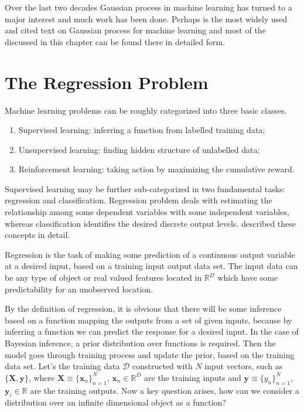 Over the last two decades Gaussian process in machine learning has turned to a major interest and much work has been done. Perhaps \cite{Rasmussen_and_Williams:2006} is the most widely used and cited text on Gaussian process for machine learning and most of the discussed in this chapter can be found there in detailed form.

\section{The Regression Problem}
Machine learning problems can be roughly categorized into three basic classes. 
\begin{enumerate}
 \item Supervised learning: inferring a function from labelled training data;
 \item Unsupervised learning: finding hidden structure of unlabelled data;
 \item Reinforcement learning: taking action by maximizing the cumulative reward. 
\end{enumerate}
Supervised learning may be further sub-categorized in two fundamental tasks: regression and classification. Regression problem deals with estimating the relationship among some dependent variables with some independent variables, whereas classification identifies the desired discrete output levels. \cite{MacKay:2003, Bishop:2006, Rogers:2011} described these concepts in detail.

Regression is the task of making some prediction of a continuous output variable at a desired input, based on a training input output data set. The input data can be any type of object or real valued features located in $\mathbb{R}^D$ which have some predictability for an unobserved location. 

By the definition of regression, it is obvious that there will be some inference based on a function mapping the outputs from a set of given inputs, because by inferring a function we can predict the response for a desired input. In the case of Bayesian inference, a prior distribution over functions is required. Then the model goes through training process and update the prior, based on the training data set. Let's the training data $\mathcal{D}$ constructed with $N$ input vectors, such as $\{\textbf{X},\textbf{y}\}$, where $\textbf{X}\equiv{\{{\textbf{x}_n}\}_{n=1}^N}$, $ \textbf{x}_n\in\mathbb{R}^D $  are the training inputs and 
$\textbf{y}\equiv{\{{y_n}\}_{n=1}^N}$, $ \textbf{y}_i\in\mathbb{R}$
are the training outputs. Now a key question arises, how can we consider a distribution over an infinite dimensional object as a function?

